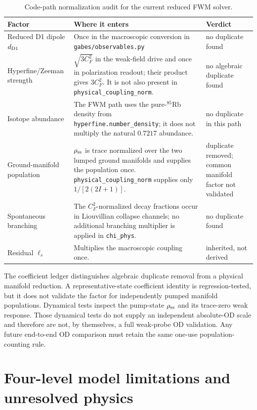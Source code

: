 \documentclass[11pt,a4paper]{article}
\begin{document}
\begin{table}[ht]
\centering
\caption{Code-path normalization audit for the current reduced FWM solver.}
\label{tab:normalization-audit}
\small
\begin{tabularx}{\textwidth}{L{3.2cm}Y L{2.5cm}}
\toprule
Factor & Where it enters & Verdict\\
\midrule
Reduced D1 dipole $d_{\rm D1}$ &
Once in the macroscopic conversion in
\texttt{gabes/observables.py} & no duplicate found\\
Hyperfine/Zeeman strength &
$\sqrt{3C_F^2}$ in the weak-field drive and once in polarization readout;
their product gives $3C_F^2$. It is not also present in
\texttt{physical\_coupling\_norm}. & no algebraic duplicate found\\
Isotope abundance &
The FWM path uses the pure-$^{85}$Rb density from
\texttt{hyperfine.number\_density}; it does not multiply the natural
$0.7217$ abundance. & no duplicate in this path\\
Ground-manifold population &
$\rho_{\rm ss}$ is trace normalized over the two lumped ground manifolds and
supplies the population once. \texttt{physical\_coupling\_norm} supplies
only $1/[2(2I+1)]$. & duplicate removed; common manifold factor not validated\\
Spontaneous branching &
The $C_F^2$-normalized decay fractions occur in Liouvillian collapse
channels; no additional branching multiplier is applied in
\texttt{chi\_phys}. & no duplicate found\\
Residual $\ell_s$ &
Multiplies the macroscopic coupling once. & inherited, not derived\\
\bottomrule
\end{tabularx}
\end{table}

The coefficient ledger distinguishes algebraic duplicate removal from a
physical manifold reduction. A representative-state coefficient identity is
regression-tested, but it does not validate the factor for independently
pumped manifold populations. Dynamical tests inspect the pump-state $\rho_{\rm ss}$ and its
trace-zero weak response. Those dynamical tests do not supply an independent
absolute-OD scale and therefore are not, by themselves, a full weak-probe OD
validation. Any future end-to-end OD comparison must retain the same one-use
population-counting rule.

\section{Four-level model limitations and unresolved physics}
\label{app:limitations}
\end{document}
